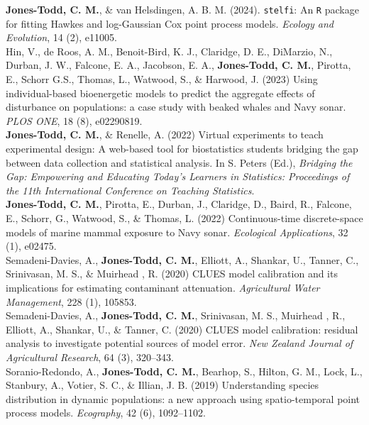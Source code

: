 \documentclass[10pt,a4paper]{moderncv}
\begin{document}
  \textbf{Jones-Todd, C. M.}, \& van Helsdingen, A. B. M. (2024). \texttt{stelfi}: An \texttt{R} package for fitting Hawkes and log-Gaussian Cox point process models. \textit{Ecology and Evolution}, 14 (2), e11005.\\

  Hin, V., de Roos, A. M., Benoit-Bird, K. J., Claridge, D. E., DiMarzio, N.,  Durban, J. W., Falcone, E. A., Jacobson, E. A., \textbf{Jones-Todd, C. M.}, Pirotta, E., Schorr G.S., Thomas, L., Watwood, S., \& Harwood, J. (2023) Using individual-based bioenergetic models to predict the aggregate effects of disturbance on populations: a case study with beaked whales and Navy sonar. \textit{PLOS ONE}, 18 (8), e02290819.\\

  \textbf{Jones-Todd, C. M.}, \& Renelle, A. (2022) Virtual experiments to teach experimental design: A web-based tool for biostatistics students bridging the gap between data collection and statistical analysis. In S. Peters (Ed.), \textit{Bridging the Gap: Empowering and Educating Today's Learners in Statistics: Proceedings of the 11th International Conference on Teaching Statistics}.\\
  
  \textbf{Jones-Todd, C. M.}, Pirotta, E., Durban, J., Claridge, D., Baird, R., Falcone, E., Schorr, G., Watwood, S., \& Thomas, L.  (2022) Continuous-time discrete-space models of marine mammal exposure to Navy sonar. \textit{Ecological Applications}, 32 (1), e02475.\\
 
  Semadeni-Davies, A., \textbf{Jones-Todd, C. M.},  Elliott, A., Shankar, U., Tanner, C., Srinivasan, M. S., \& Muirhead , R. (2020) CLUES model calibration and its implications for estimating contaminant attenuation. \textit{Agricultural Water Management}, 228 (1), 105853.\\

    Semadeni-Davies, A., \textbf{Jones-Todd, C. M.}, Srinivasan, M. S.,  Muirhead , R.,  Elliott, A., Shankar, U., \& Tanner, C. (2020) CLUES model calibration: residual analysis to investigate potential sources of model error. \textit{New Zealand Journal of Agricultural Research}, 64 (3), 320--343.\\

 Soranio-Redondo, A., \textbf{Jones-Todd, C. M.}, Bearhop, S., Hilton, G. M., Lock, L., Stanbury, A., Votier, S. C., \& Illian, J. B. (2019) Understanding species distribution in dynamic populations: a new approach using spatio-temporal point process models. \textit{Ecography}, 42 (6), 1092--1102.\\
  
\end{document}
